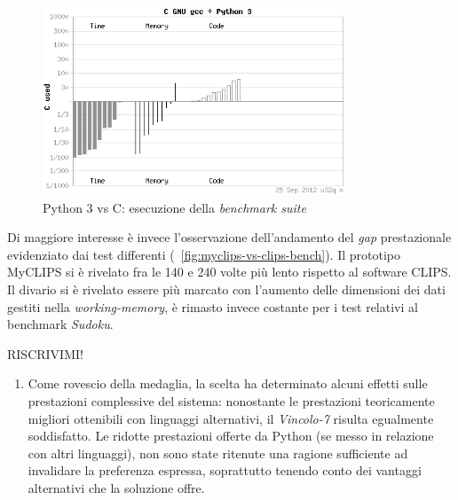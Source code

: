 \begin{figure}
\centering
\includegraphics[width=0.8\textwidth]{Immagini/Capitolo3/c-vs-python.png}
\caption{Python 3 vs C: esecuzione della \emph{benchmark suite}~\cite{cpybench}  }\label{fig:c-vs-python-bench}
\end{figure}

Di maggiore interesse è invece l'osservazione dell'andamento del \emph{gap} prestazionale evidenziato dai test differenti (\figurename~\ref{fig:myclips-vs-clips-bench}). Il prototipo MyCLIPS si è rivelato fra le 140 e 240 volte più lento rispetto al software CLIPS. Il divario si è rivelato essere più marcato con l'aumento delle dimensioni dei dati gestiti nella \emph{working-memory}, è rimasto invece costante per i test relativi al benchmark \emph{Sudoku}.

RISCRIVIMI!
\begin{enumerate}
\item Come rovescio della medaglia, la scelta ha determinato alcuni effetti sulle prestazioni complessive del sistema: nonostante le prestazioni teoricamente migliori ottenibili con linguaggi alternativi, il \emph{Vincolo-7} risulta egualmente soddisfatto. Le ridotte prestazioni offerte da Python (se messo in relazione con altri linguaggi), non sono state ritenute una ragione sufficiente ad invalidare la preferenza espressa, soprattutto tenendo conto dei vantaggi alternativi che la soluzione offre.
\end{enumerate}


